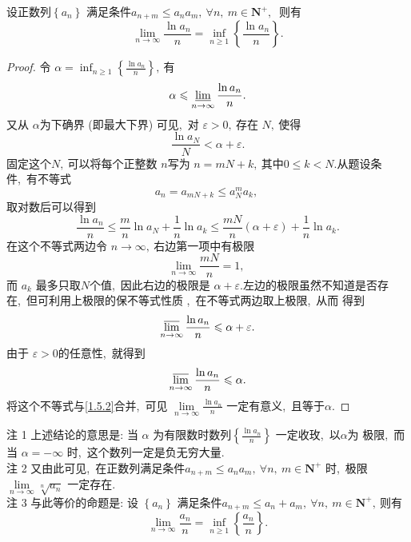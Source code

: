 \newpage
\begin{example}
	设正数列$  \left\{a_{n}\right\}$  满足条件$  a_{n+m} \leqslant a_{n} a_{m},\  \forall n,\  m \in \mathbf{N}^{+} ,\ $ 则有
	$$\lim _{n \rightarrow \infty} \frac{\ln a_{n}}{n}=\inf _{n \geqslant 1}\left\{\frac{\ln a_{n}}{n}\right\} .$$
\end{example}
\begin{proof}
	令 $ \alpha=\inf _{n \geqslant 1}\left\{\frac{\ln a_{n}}{n}\right\} ,\  $有
	\begin{equation}
		\alpha \leqslant \varliminf_{n \rightarrow \infty} \frac{\ln a_{n}}{n} .\label{1.5.2}
	\end{equation}
	又从 $ \alpha  $为下确界 (即最大下界) 可见,\  对  $\varepsilon>0 ,\  $存在  $N ,\  $使得 		
	$$\frac{\ln a_{N}}{N}<\alpha+\varepsilon .$$		
	固定这个$  N ,\  $可以将每个正整数  $n  $写为  $n=m N+k ,\  $其中$  0 \leqslant k<N . $从题设条 件,\  有不等式 		
	$$a_{n}=a_{m N+k} \leqslant a_{N}^{m} a_{k},\ $$
	取对数后可以得到
	$$\frac{\ln a_{n}}{n} \leqslant \frac{m}{n} \ln a_{N}+\frac{1}{n} \ln a_{k} \leqslant \frac{m N}{n}(\alpha+\varepsilon)+\frac{1}{n} \ln a_{k} .$$
	在这个不等式两边令  $n \rightarrow \infty ,\ $右边第一项中有极限
	$$\lim _{n \rightarrow \infty} \frac{m N}{n}=1 ,\ $$
	而 $ a_{k}$  最多只取$ N  $个值,\  因此右边的极限是 $ \alpha+\varepsilon . $左边的极限虽然不知道是否存 在,\  但可利用上极限的保不等式性质 ,\  在不等式两边取上极限,\  从而 得到
	$$\varlimsup_{n \rightarrow \infty} \frac{\ln a_{n}}{n} \leqslant \alpha+\varepsilon .$$
	由于 $ \varepsilon>0  $的任意性,\  就得到
	$$\varlimsup_{n \rightarrow \infty} \frac{\ln a_{n}}{n} \leqslant \alpha .$$
	将这个不等式与\eqref{1.5.2}合并,\  可见 $ \lim\limits_{n \rightarrow \infty} \frac{\ln a_{n}}{n} $ 一定有意义,\  且等于$  \alpha .$
\end{proof}
\begin{note}
	注 1 上述结论的意思是: 当 $ \alpha $ 为有限数时数列$  \left\{\frac{\ln a_{n}}{n}\right\} $ 一定收玫,\  以$  \alpha $为 极限,\  而当  $\alpha=-\infty$  时,\  这个数列一定是负无穷大量.\\
	注 2 又由此可见,\  在正数列满足条件$  a_{n+m} \leqslant a_{n} a_{m},\  \forall n,\  m \in \mathbf{N}^{+}$ 时,\  极限  $\lim\limits_{n \rightarrow \infty} \sqrt[n]{a_{n}} $ 一定存在.\\
	注 3 与此等价的命题是: 设 $ \left\{a_{n}\right\}$  满足条件$ a_{n+m} \leqslant a_{n}+a_{m},\  \forall n,\  m \in \mathbf{N}^{+} ,\  $则有
	$$\lim\limits_{n\rightarrow\infty}\frac{a_n}{n}=\inf\limits_{n\geqslant 1}\left\{\frac{a_n}{n}\right\}.$$
\end{note}
